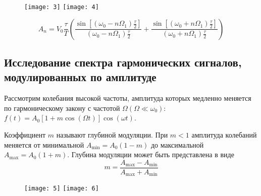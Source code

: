 \begin{figure}[H]
    \begin{floatrow}
        {\texttt{[image: 3]}}
        {\texttt{[image: 4]}}        
    \end{floatrow}
\end{figure}

\begin{equation}
A_{n} =  V_{0}
\frac{\tau}{T}\left(\frac{\sin
\left[\left(\omega_{0}-n
\Omega_{1}\right)
\frac{\tau}{2}\right]}{\left(\omega_{0}-n
\Omega_{1}\right)
\frac{\tau}{2}}+\frac{\sin
\left[\left(\omega_{0}+n
\Omega_{1}\right)
\frac{\tau}{2}\right]}{\left(\omega_{0}+n
\Omega_{1}\right) \frac{\tau}{2}}\right)
\end{equation}

\subsection*{Исследование спектра гармонических сигналов, модулированных по амплитуде}

Рассмотрим колебания высокой частоты,
амплитуда которых медленно меняется по
гармоническому закону с частотой $\Omega
\left(\Omega \ll
\omega_{0}\right)$:\newline
$f(t)=A_{0}[1+m \cos (\Omega t)] \cos
(\omega t)$.

Коэффициент $m$ называют глубиной модуляции. При $m < 1$ амплитуда колебаний меняется от минимальной $A_{\min }=A_{0}(1-m)$ до максимальной $A_{\max }=A_{0}(1+m)$. Глубина модуляции может быть представлена в виде 
\begin{equation}
m=\frac{A_{\max }-A_{\min }}{A_{\max }+A_{\min }}
\end{equation} 

\begin{figure}[H]
    \begin{floatrow}
{\texttt{[image: 5]}}
        {\texttt{[image: 6]}}        
    \end{floatrow}
\end{figure}

